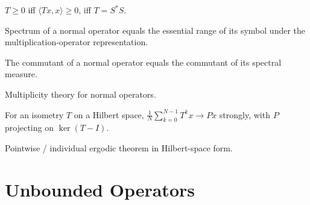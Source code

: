 \begin{theorem}
  \label{thm:positive-iff-quadratic}
  \leanok
  $T \ge 0$ iff $\langle T x, x \rangle \ge 0$, iff $T = S^* S$.
\end{theorem}

\begin{theorem}[Rudin 12.30, spectrum of normal $=$ essential range]
  \label{thm:spectrum-normal-essRange}
  \leanok
  Spectrum of a normal operator equals the essential range of its
  symbol under the multiplication-operator representation.
\end{theorem}

\begin{theorem}
  \label{thm:commutant-normal}
  \leanok
  The commutant of a normal operator equals the commutant of its
  spectral measure.
\end{theorem}

\begin{theorem}
  \label{thm:multiplicity-normal}
  \leanok
  Multiplicity theory for normal operators.
\end{theorem}

\begin{theorem}
  \label{thm:mean-ergodic}
  \leanok
  For an isometry $T$ on a Hilbert space, $\frac{1}{N} \sum_{k=0}^{N-1}
  T^k x \to P x$ strongly, with $P$ projecting on $\ker(T - I)$.
\end{theorem}

\begin{theorem}
  \label{thm:pointwise-ergodic-hilbert}
  \leanok
  Pointwise / individual ergodic theorem in Hilbert-space form.
\end{theorem}

\chapter{Unbounded Operators}

